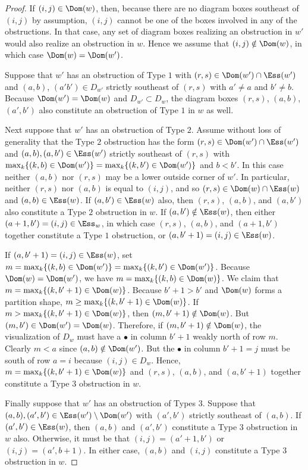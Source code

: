 \begin{proof}
If $(i,j) \in \Dom(w)$, then, because there are no diagram boxes southeast of $(i,j)$ by assumption, $(i,j)$ cannot be one of the boxes involved in any of the obstructions.  In that case, any set of diagram boxes realizing an obstruction in $w'$ would also realize an obstruction in $w$.  Hence we assume that $(i,j) \notin \Dom(w)$, in which case $\Dom(w) = \Dom(w')$.

Suppose that $w'$ has an obstruction of Type $1$ with $(r,s) \in \Dom(w') \cap \Ess(w')$ and $(a,b)$, $(a'b') \in D_{w'}$ strictly southeast of $(r,s)$ with $a' \neq a$ and $b' \neq b$.  Because $\Dom(w') = \Dom(w)$ and $D_{w'} \subset D_w$, the diagram boxes $(r,s)$, $(a,b)$, $(a',b')$ also constitute an obstruction of Type $1$ in $w$ as well.

Next suppose that $w'$ has an obstruction of Type $2$.  Assume without loss of generality that the Type $2$ obstruction has the form  $(r,s) \in \Dom(w') \cap \Ess(w')$ and $(a,b), (a,b') \in \Ess(w')$ strictly southeast of $(r,s)$ with $\max_k \{(k,b) \in \Dom(w')\} = \max_k \{(k,b') \in \Dom(w') \}$ and $b<b'$.  In this case neither $(a,b)$ nor $(r,s)$ may be a lower outside corner of $w'$.   In particular, neither $(r,s)$ nor $(a,b)$ is equal to $(i,j)$, and so $(r,s) \in \Dom(w) \cap \Ess(w)$ and $(a,b) \in \Ess(w)$.  If $(a,b') \in \Ess(w)$ also, then $(r,s)$, $(a,b)$, and $(a,b')$ also constitute a Type $2$ obstruction in $w$.  If $(a,b') \notin \Ess(w)$, then either $(a+1,b') = (i,j) \in \Ess_w$, in which case $(r,s)$, $(a,b)$, and $(a+1,b')$ together constitute a Type $1$ obstruction, or $(a,b'+1) = (i,j) \in \Ess(w)$.  

If $(a,b'+1) = (i,j) \in \Ess(w)$, set $m = \max_k \{(k,b) \in \Dom(w')\} = \max_k \{(k,b') \in \Dom(w')\}$.  Because $\Dom(w) = \Dom(w')$, we have $m = \max_k \{(k,b) \in \Dom(w)\}$.  We claim that $m = \max_k \{(k,b'+1) \in \Dom(w)\}$.   Because $b'+1>b'$ and $\Dom(w)$ forms a partition shape, $m \geq \max_k \{(k,b'+1) \in \Dom(w)\}$.  If $m > \max_k \{(k,b'+1) \in \Dom(w)\}$, then $(m,b'+1) \notin \Dom(w)$.  But $(m,b') \in \Dom(w') = \Dom(w)$.  Therefore, if $(m,b'+1) \notin \Dom(w)$, the visualization of $D_w$ must have a $\bullet$ in column $b'+1$ weakly north of row $m$.  Clearly $m<a$ since $(a,b) \notin \Dom(w')$.  But the $\bullet$ in column $b'+1 = j$ must be south of row $a = i$ because $(i,j) \in D_w$. Hence, $m = \max_k \{(k,b'+1) \in \Dom(w)\}$ and $(r,s)$, $(a,b)$, and $(a, b'+1)$ together constitute a Type $3$ obstruction in $w$. 

Finally suppose that $w'$ has an obstruction of Types $3$.  Suppose that $(a,b), (a',b') \in \Ess(w') \setminus \Dom(w')$ with $(a',b')$ strictly southeast of $(a,b)$.  If $(a',b') \in \Ess(w)$, then $(a,b)$ and $(a',b')$ constitute a Type $3$ obstruction in $w$ also.  Otherwise, it must be that $(i,j) = (a'+1,b')$ or $(i,j) = (a',b+1)$.  In either case, $(a,b)$ and $(i,j)$ constitute a Type $3$ obstruction in $w$.
\end{proof}

